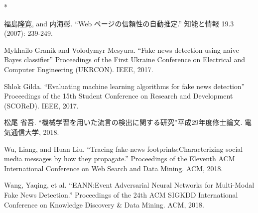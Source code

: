 \documentclass[a4paper,12pt,oneside,openany,uplatex]{jsbook}
\begin{document}


\newpage
% 
% 
%
%

\begin{thebibliography} {*}

 福島隆寛, and 内海彰.\@
``Web ページの信頼性の自動推定.'' 知能と情報 19.3 (2007): 239-249.

 Mykhailo Granik and Volodymyr Mesyura. \@
``Fake news detection using naive Bayes classifier''
Proceedings of the First Ukraine Conference on Electrical and Computer Engineering (UKRCON). IEEE, 2017.

 Shlok Gilda.\@
``Evaluating machine learning algorithms for fake news detection''
Proceedings of the 15th Student Conference on Research and Development (SCOReD). IEEE, 2017.

 松尾 省吾.\@
``機械学習を用いた流言の検出に関する研究''\@ 平成29年度修士論文. 電気通信大学, 2018.

 Wu, Liang, and Huan Liu.\@
``Tracing fake-news footprints:\@ Characterizing social media messages by how they propagate.''
Proceedings of the Eleventh ACM International Conference on Web Search and Data Mining. ACM, 2018.

 Wang, Yaqing, et al.\@
``EANN:\@ Event Adversarial Neural Networks for Multi-Modal Fake News Detection.''
Proceedings of the 24th ACM SIGKDD International Conference on Knowledge Discovery \& Data Mining. ACM, 2018.
\end{thebibliography}

%

%
%
\end{document}
